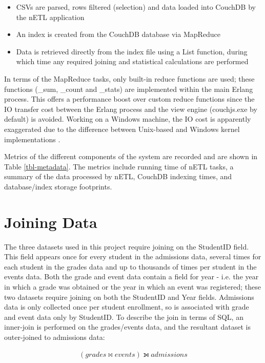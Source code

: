 \begin{itemize}
  \item CSVs are parsed, rows filtered (selection) and data loaded into CouchDB by the nETL application
  \item An index is created from the CouchDB database via MapReduce
  \item Data is retrieved directly from the index file using a List function, during which time any required joining and statistical calculations are performed
\end{itemize}

In terms of the MapReduce tasks, only built-in reduce functions are used; these functions (\_sum, \_count and \_stats) are implemented within the main Erlang process. This offers a performance boost over custom reduce functions since the IO transfer cost between the Erlang process and the view engine (couchjs.exe by default) is avoided. Working on a Windows machine, the IO cost is apparently exaggerated due to the difference between Unix-based and Windows kernel implementations \cite{slack1Nov}.

Metrics of the different components of the system are recorded and are shown in Table \ref{tbl-metadata}. The metrics include running time of nETL tasks, a summary of the data processed by nETL, CouchDB indexing times, and database/index storage footprints.



\section{Joining Data}
The three datasets used in this project require joining on the StudentID field. This field appears once for every student in the admissions data, several times for each student in the grades data and up to thousands of times per student in the events data. Both the grade and event data contain a field for year - i.e. the year in which a grade was obtained or the year in which an event was registered; these two datasets require joining on both the StudentID and Year fields. Admissions data is only collected once per student enrollment, so is associated with grade and event data only by StudentID. To describe the join in terms of SQL, an inner-join is performed on the grades/events data, and the resultant dataset is outer-joined to admissions data: \begin{spreadlines}{15pt}
  \begin{gather*}
    (grades \bowtie events) \leftouterjoin admissions
  \end{gather*}
\end{spreadlines}


